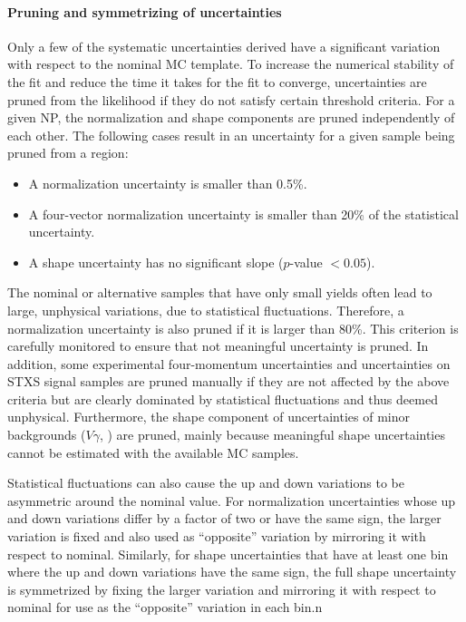 \paragraph{Pruning and symmetrizing of uncertainties}
Only a few of the systematic uncertainties derived have a significant variation with respect to the nominal MC template. To increase the numerical stability of the fit and reduce the time it takes for the fit to converge, uncertainties are pruned from the likelihood if they do not satisfy certain threshold criteria.
For a given NP, the normalization and shape components are pruned independently of each other.
The following cases result in an uncertainty for a given sample being pruned from a region:
\begin{itemize}
    \item A normalization uncertainty is smaller than 0.5\%.
    \item A four-vector normalization uncertainty is smaller than 20\% of the statistical uncertainty. 
    \item A shape uncertainty has no significant slope ($p$-value $< 0.05$).
\end{itemize}
The nominal or alternative samples that have only small yields often lead to large, unphysical variations, due to statistical fluctuations. 
Therefore, a normalization uncertainty is also pruned if it is larger than 80\%. 
This criterion is carefully monitored to ensure that not meaningful uncertainty is pruned.
In addition, some experimental four-momentum uncertainties and uncertainties on STXS signal samples are pruned manually if they are not affected by the above criteria but are clearly dominated by statistical fluctuations and thus deemed unphysical.
Furthermore, the shape component of uncertainties of minor backgrounds ($V\gamma$, \Zgamma) are pruned, mainly because meaningful shape uncertainties cannot be estimated with the available MC samples. 

Statistical fluctuations can also cause the up and down variations to be asymmetric around the nominal value. 
For normalization uncertainties whose up and down variations differ by a factor of two or have the same sign, the larger variation is fixed and also used as ``opposite'' variation by mirroring it with respect to nominal.
Similarly, for shape uncertainties that have at least one bin where the up and down variations have the same sign, the full shape uncertainty is symmetrized by fixing the larger variation and mirroring it with respect to nominal for use as the ``opposite'' variation in each bin.n

